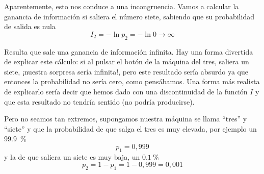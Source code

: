 Aparentemente, esto nos conduce a una incongruencia. Vamos a calcular la
ganancia de información si saliera el número siete, sabiendo que su
probabilidad de salida es nula
\[
  I_2 = -\ln p_2 = -\ln 0 \to \infty
\]

Resulta que sale una ganancia de información infinita. Hay una forma
divertida de explicar este cálculo:
si al pulsar el botón de la máquina del tres, saliera un siete,
¡nuestra sorpresa sería infinita!, pero este resultado sería  absurdo
ya que entonces la probabilidad no sería cero, como pensábamos.
Una forma más realista de explicarlo sería decir que hemos dado con una
discontinuidad de la función $I$ y que esta resultado no tendría sentido
(no podría producirse).

Pero no seamos tan extremos, supongamos nuestra máquina se llama ``tres''
y ``siete'' y que la probabilidad de que salga el tres es muy elevada, por
ejemplo un \SI{99,9}{\percent}
\[
  p_1=0,999
\]
y la de que saliera un siete es muy baja, un $\SI{0,1}{\percent}$
\[
  p_2 = 1 - p_1 = 1-0,999 = 0,001
\]
